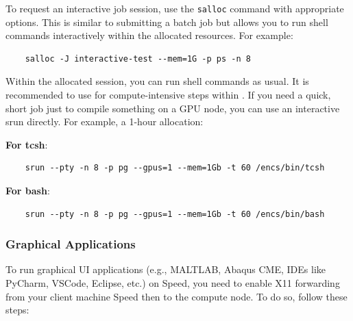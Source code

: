 To request an interactive job session, use the \texttt{salloc} command with appropriate options.
This is similar to submitting a batch job but allows you to run shell commands interactively 
within the allocated resources. For example:
\begin{verbatim}
	salloc -J interactive-test --mem=1G -p ps -n 8
\end{verbatim}

\noindent Within the allocated  session, you can run shell commands as usual. 
It is recommended to use  for compute-intensive steps within . 
If you need a quick, short job just to compile something on a GPU node, 
you can use an interactive srun directly. For example, a 1-hour allocation:

\noindent \textbf{For tcsh}:
\begin{verbatim}
	srun --pty -n 8 -p pg --gpus=1 --mem=1Gb -t 60 /encs/bin/tcsh
\end{verbatim}

\noindent \textbf{For bash}:
\begin{verbatim}
	srun --pty -n 8 -p pg --gpus=1 --mem=1Gb -t 60 /encs/bin/bash
\end{verbatim}


\subsubsection{Graphical Applications}
\label{sect:graphical-applications}

To run graphical UI applications (e.g., MALTLAB, Abaqus CME, IDEs like PyCharm, VSCode, Eclipse, etc.) on Speed, 
you need to enable X11 forwarding from your client machine Speed then to the compute node.
To do so, follow these steps:

